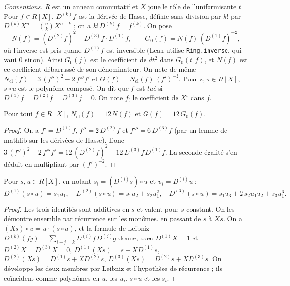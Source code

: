\noindent\emph{Conventions.} $R$ est un anneau commutatif et $X$ joue le rôle de l'uniformisante $t$. Pour $f \in R[X]$, $D^{(k)} f$ est la dérivée de Hasse, définie sans division par $k!$ par $D^{(k)} X^n = \binom nk X^{n-k}$ ; on a $k!\,D^{(k)} f = f^{(k)}$. On pose
\[
N(f) = (D^{(2)} f)^2 - D^{(3)} f \cdot D^{(1)} f, \qquad G_0(f) = N(f)\,(D^{(1)} f)^{-2},
\]
où l'inverse est pris quand $D^{(1)} f$ est inversible (Lean utilise \texttt{Ring.\allowbreak{}inverse}, qui vaut $0$ sinon). Ainsi $G_0(f)$ est le coefficient de $dt^2$ dans $G_0(t, f)$, et $N(f)$ est ce coefficient débarrassé de son dénominateur. On note de même $N_{\mathrm{cl}}(f) = 3\,(f'')^2 - 2\,f''' f'$ et $G(f) = N_{\mathrm{cl}}(f)\,(f')^{-2}$. Pour $s, u \in R[X]$, $s \circ u$ est le polynôme composé. On dit que $f$ est \emph{tué} si $D^{(1)} f = D^{(2)} f = D^{(3)} f = 0$. On note $f_i$ le coefficient de $X^i$ dans $f$.

\begin{enonce}
Pour tout $f \in R[X]$, $N_{\mathrm{cl}}(f) = 12\,N(f)$ et $G(f) = 12\,G_0(f)$.
\end{enonce}

\begin{proof}
On a $f' = D^{(1)} f$, $f'' = 2\,D^{(2)} f$ et $f''' = 6\,D^{(3)} f$ (par un lemme de mathlib sur les dérivées de Hasse). Donc $3\,(f'')^2 - 2\,f''' f' = 12\,(D^{(2)} f)^2 - 12\,D^{(3)} f\,D^{(1)} f$. La seconde égalité s'en déduit en multipliant par $(f')^{-2}$.
\end{proof}

\begin{lemme}\label{lem:93-chaine}
Pour $s, u \in R[X]$, en notant $s_i = (D^{(i)} s) \circ u$ et $u_i = D^{(i)} u$ :
\[
D^{(1)}(s \circ u) = s_1 u_1, \quad
D^{(2)}(s \circ u) = s_1 u_2 + s_2 u_1^2, \quad
D^{(3)}(s \circ u) = s_1 u_3 + 2\,s_2 u_1 u_2 + s_3 u_1^3 .
\]
\end{lemme}

\begin{proof}
Les trois identités sont additives en $s$ et valent pour $s$ constant. On les démontre ensemble par récurrence sur les monômes, en passant de $s$ à $Xs$. On a $(Xs) \circ u = u \cdot (s \circ u)$, et la formule de Leibniz $D^{(k)}(fg) = \sum_{i+j=k} D^{(i)} f\, D^{(j)} g$ donne, avec $D^{(1)}X = 1$ et $D^{(2)}X = D^{(3)}X = 0$, $D^{(1)}(Xs) = s + X D^{(1)}s$, $D^{(2)}(Xs) = D^{(1)}s + X D^{(2)}s$, $D^{(3)}(Xs) = D^{(2)}s + X D^{(3)}s$. On développe les deux membres par Leibniz et l'hypothèse de récurrence ; ils coïncident comme polynômes en $u$, les $u_i$, $s \circ u$ et les $s_i$.
\end{proof}

